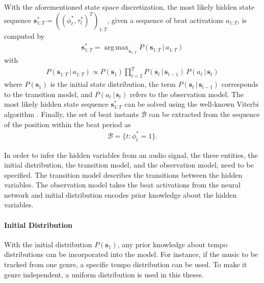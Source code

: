 \documentclass{scrartcl}
\DeclareMathOperator*{\argmax}{arg\,max}
\begin{document}
With the aforementioned state space discretization, the most likely hidden state sequence $\mathbf s_{1:T}^* = \left((\phi_t^*, \tau_t^*)^T\right)_{1:T}$, given a sequence of beat activations $a_{1:T}$, is computed by
\begin{align}
\mathbf s_{1:T}^* = \argmax_{\mathbf s_{1:T}} P(\mathbf s_{1:T}\,|\, a_{1:T})
\label{eq:most_likely_states}
\end{align} 
with 
\begin{align}
 P(\mathbf s_{1:T}\,|\, a_{1:T}) \propto P(\mathbf s_1) \prod_{t=2}^T P(\mathbf s_t\,|\,\mathbf s_{t-1})\, P( a_t\,|\,\mathbf s_{t})
\end{align} 
where $P(\mathbf s_1)$ is the initial state distribution, the term $P(\mathbf s_t\,|\,\mathbf s_{t-1})$ corresponds to the transition model, and $P(a_t\,|\,\mathbf s_{t})$ refers to the observation model. The most likely hidden state sequence $\mathbf s_{1:T}^*$ can be solved using the well-known Viterbi algorithm \cite{Viterbi1967}. Finally, the set of beat instants $\mathcal B$ can be extracted from the sequence of the position within the beat period as
\begin{align}
\mathcal B = \{ t: \phi_t^*=1\}.
\end{align} 

In order to infer the hidden variables from an audio signal, the three entities, the initial distribution,  the transition model, and the observation model, need to be  specified. The transition model describes the transitions between the hidden variables. The observation model takes the beat activations from the neural network
and initial distribution encodes prior knowledge about the hidden variables.

\paragraph{Initial Distribution} 
With the initial distribution $P(\mathbf s_1)$, any prior knowledge about tempo distributions can be incorporated into the model. For instance, if the music to be tracked from one genre, a specific tempo distribution can be used. To make it genre independent, a uniform distribution is used in this theses. 
\end{document}
